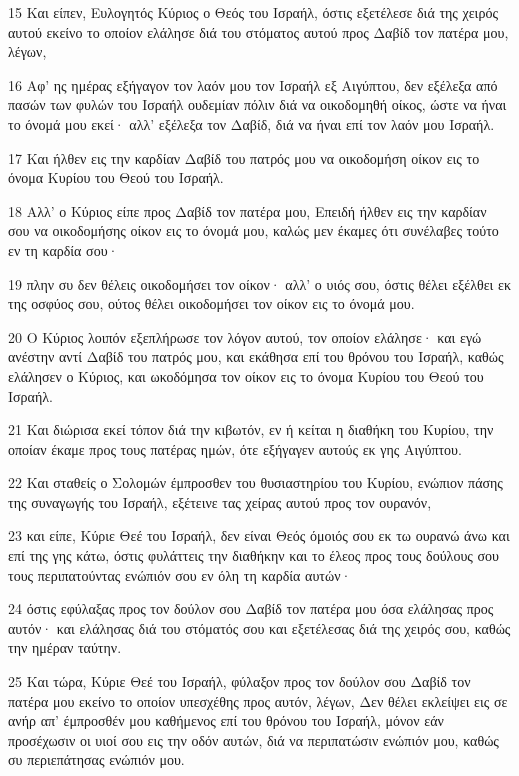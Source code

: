 \par 15 Και είπεν, Ευλογητός Κύριος ο Θεός του Ισραήλ, όστις εξετέλεσε διά της χειρός αυτού εκείνο το οποίον ελάλησε διά του στόματος αυτού προς Δαβίδ τον πατέρα μου, λέγων,
\par 16 Αφ' ης ημέρας εξήγαγον τον λαόν μου τον Ισραήλ εξ Αιγύπτου, δεν εξέλεξα από πασών των φυλών του Ισραήλ ουδεμίαν πόλιν διά να οικοδομηθή οίκος, ώστε να ήναι το όνομά μου εκεί· αλλ' εξέλεξα τον Δαβίδ, διά να ήναι επί τον λαόν μου Ισραήλ.
\par 17 Και ήλθεν εις την καρδίαν Δαβίδ του πατρός μου να οικοδομήση οίκον εις το όνομα Κυρίου του Θεού του Ισραήλ.
\par 18 Αλλ' ο Κύριος είπε προς Δαβίδ τον πατέρα μου, Επειδή ήλθεν εις την καρδίαν σου να οικοδομήσης οίκον εις το όνομά μου, καλώς μεν έκαμες ότι συνέλαβες τούτο εν τη καρδία σου·
\par 19 πλην συ δεν θέλεις οικοδομήσει τον οίκον· αλλ' ο υιός σου, όστις θέλει εξέλθει εκ της οσφύος σου, ούτος θέλει οικοδομήσει τον οίκον εις το όνομά μου.
\par 20 Ο Κύριος λοιπόν εξεπλήρωσε τον λόγον αυτού, τον οποίον ελάλησε· και εγώ ανέστην αντί Δαβίδ του πατρός μου, και εκάθησα επί του θρόνου του Ισραήλ, καθώς ελάλησεν ο Κύριος, και ωκοδόμησα τον οίκον εις το όνομα Κυρίου του Θεού του Ισραήλ.
\par 21 Και διώρισα εκεί τόπον διά την κιβωτόν, εν ή κείται η διαθήκη του Κυρίου, την οποίαν έκαμε προς τους πατέρας ημών, ότε εξήγαγεν αυτούς εκ γης Αιγύπτου.
\par 22 Και σταθείς ο Σολομών έμπροσθεν του θυσιαστηρίου του Κυρίου, ενώπιον πάσης της συναγωγής του Ισραήλ, εξέτεινε τας χείρας αυτού προς τον ουρανόν,
\par 23 και είπε, Κύριε Θεέ του Ισραήλ, δεν είναι Θεός όμοιός σου εκ τω ουρανώ άνω και επί της γης κάτω, όστις φυλάττεις την διαθήκην και το έλεος προς τους δούλους σου τους περιπατούντας ενώπιόν σου εν όλη τη καρδία αυτών·
\par 24 όστις εφύλαξας προς τον δούλον σου Δαβίδ τον πατέρα μου όσα ελάλησας προς αυτόν· και ελάλησας διά του στόματός σου και εξετέλεσας διά της χειρός σου, καθώς την ημέραν ταύτην.
\par 25 Και τώρα, Κύριε Θεέ του Ισραήλ, φύλαξον προς τον δούλον σου Δαβίδ τον πατέρα μου εκείνο το οποίον υπεσχέθης προς αυτόν, λέγων, Δεν θέλει εκλείψει εις σε ανήρ απ' έμπροσθέν μου καθήμενος επί του θρόνου του Ισραήλ, μόνον εάν προσέχωσιν οι υιοί σου εις την οδόν αυτών, διά να περιπατώσιν ενώπιόν μου, καθώς συ περιεπάτησας ενώπιόν μου.
